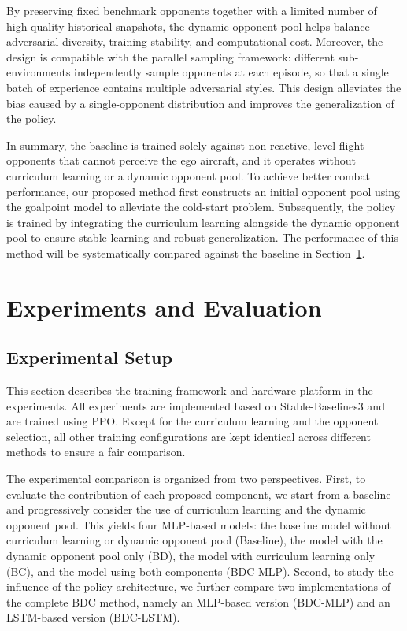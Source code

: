 \documentclass[pdflatex,sn-mathphys-num]{sn-jnl}%
\theoremstyle{thmstyleone}%
\theoremstyle{thmstyletwo}%
\theoremstyle{thmstylethree}%
\begin{document}
By preserving fixed benchmark opponents together with a limited number of high-quality historical snapshots, the dynamic opponent pool helps balance adversarial diversity, training stability, and computational cost. Moreover, the design is compatible with the parallel sampling framework: different sub-environments independently sample opponents at each episode, so that a single batch of experience contains multiple adversarial styles. This design alleviates the bias caused by a single-opponent distribution and improves the generalization of the policy.


In summary, the baseline is trained solely against non-reactive, level-flight opponents that cannot perceive the ego aircraft, and it operates without curriculum learning or a dynamic opponent pool. To achieve better combat performance, our proposed method first constructs an initial opponent pool using the goalpoint model to alleviate the cold-start problem. Subsequently, the policy is trained by integrating the curriculum learning alongside the dynamic opponent pool to ensure stable learning and robust generalization. The performance of this method will be systematically compared against the baseline in Section~\ref{sec:experiment}.


\section{Experiments and Evaluation}
\label{sec:experiment}
\subsection{Experimental Setup}

This section describes the training framework and hardware platform in the experiments. All experiments are implemented based on Stable-Baselines3 and are trained using PPO. Except for the curriculum learning and the opponent selection, all other training configurations are kept identical across different methods to ensure a fair comparison.

The experimental comparison is organized from two perspectives. First, to evaluate the contribution of each proposed component, we start from a baseline and progressively consider the use of curriculum learning and the dynamic opponent pool. This yields four MLP-based models: the baseline model without curriculum learning or dynamic opponent pool (Baseline), the model with the dynamic opponent pool only (BD), the model with curriculum learning only (BC), and the model using both components (BDC-MLP). Second, to study the influence of the policy architecture, we further compare two implementations of the complete BDC method, namely an MLP-based version (BDC-MLP) and an LSTM-based \cite{LSTM} version (BDC-LSTM).
\end{document}
